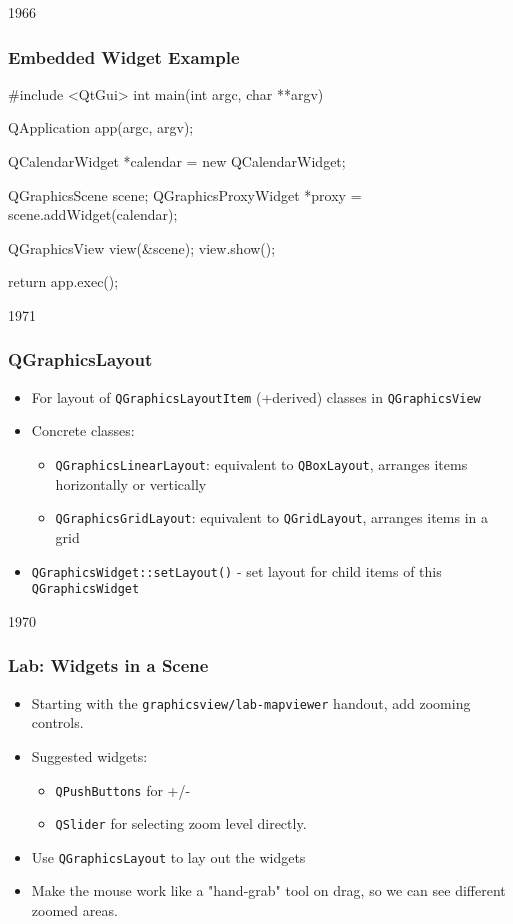 \begin{slide}[fragile]{1966}


\frametitle{Embedded Widget Example}
\begin{cpp}
#include <QtGui>
int main(int argc, char **argv) {
   QApplication app(argc, argv);

   QCalendarWidget *calendar = new QCalendarWidget;

   QGraphicsScene scene;
   QGraphicsProxyWidget *proxy = scene.addWidget(calendar);

   QGraphicsView view(&scene);
   view.show();

   return app.exec();
}
\end{cpp}
\end{slide}

\begin{slide}{1971}
\frametitle{QGraphicsLayout}

\begin{itemize}

\item For layout of \texttt{QGraphicsLayoutItem} (+derived) classes in \texttt{QGraphicsView}
\item Concrete classes:
    \begin{itemize}
    \item \texttt{QGraphicsLinearLayout}: equivalent to \texttt{QBoxLayout}, arranges items horizontally or vertically
    \item \texttt{QGraphicsGridLayout}: equivalent to \texttt{QGridLayout}, arranges items in a grid
    \end{itemize}
\item \texttt{QGraphicsWidget::setLayout()} - set layout for child items of this \texttt{QGraphicsWidget}
\end{itemize}
\end{slide}

\begin{slide}{1970}
\frametitle{Lab: Widgets in a Scene}
\begin{itemize}
\item Starting with the \texttt{graphicsview/lab-mapviewer} handout, add zooming controls.
\item Suggested widgets:
    \begin{itemize}
    \item \texttt{QPushButtons} for +/-
    \item \texttt{QSlider} for selecting zoom level directly. 
    \end{itemize}
\item Use \texttt{QGraphicsLayout} to lay out the widgets
\item Make the mouse work like a "hand-grab" tool on drag, so we can see different zoomed areas. 
\end{itemize}
\end{slide}


